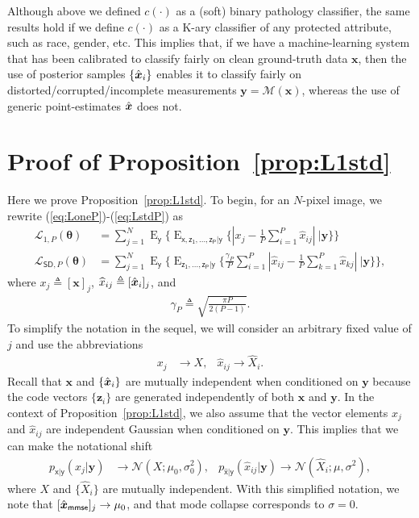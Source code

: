 \documentclass{article}
\theoremstyle{plain}
\theoremstyle{definition}
\theoremstyle{remark}
\renewcommand{\hat}{\widehat}
\newcommand{\defn}{\triangleq}
\newcommand{\hvec}[1]{\ensuremath{\Hat{\boldsymbol{#1}}}}
\renewcommand{\vec}[1]{\ensuremath{\boldsymbol{#1}}}
\newcommand{\mc}[1]{\ensuremath{\mathcal{#1}}}
\DeclareMathOperator{\E}{E}
\renewcommand{\eqref}[1]{(\ref{eq:#1})}
\newcommand{\propref}[1]{Proposition~\ref{prop:#1}}
\newcommand{\mmse}{_{\mathsf{mmse}}}
\newcommand{\pxgy}{p_{\mathsf{x}|\mathsf{y}}}
\newcommand{\pxhgy}{p_{\hat{\mathsf{x}}|\mathsf{y}}}
\newcommand{\Ey}{\E_{\mathsf{y}}}
\newcommand{\EzPgy}{\E_{\mathsf{z_1,...,z_P}|\mathsf{y}}}
\newcommand{\ExzPgy}{\E_{\mathsf{x,z_1,...,z_P}|\mathsf{y}}}
\newcommand{\LoneP}{\mc{L}_{1,P}}
\newcommand{\LstdP}{\mc{L}_{\mathsf{SD},P}}
\begin{document}
Although above we defined $c(\cdot)$ as a (soft) binary pathology classifier, the same results hold if we define $c(\cdot)$ as a K-ary classifier of any protected attribute, such as race, gender, etc.
This implies that, if we have a machine-learning system that has been calibrated to classify fairly on clean ground-truth data $\vec{x}$, then the use of posterior samples $\{\hvec{x}_i\}$ enables it to classify fairly on distorted/corrupted/incomplete measurements $\vec{y}=\mc{M}(\vec{x})$, whereas the use of generic point-estimates $\hvec{x}$ does not.

\section{Proof of \propref{L1std}} \label{app:L1std}

Here we prove \propref{L1std}.
To begin, for an $N$-pixel image, we rewrite \eqref{LoneP}-\eqref{LstdP} as
\begin{align}
\LoneP(\vec{\theta})
&= \textstyle \sum_{j=1}^N \Ey\big\{ 
\ExzPgy\big\{ |x_j-\frac{1}{P}\sum_{i=1}^P \hat{x}_{ij}|~\big|\vec{y}\big\} 
\big\} 
\label{eq:LonePB}\\
\LstdP(\vec{\theta})
&= \textstyle \sum_{j=1}^N \Ey\big\{ 
\EzPgy\big\{ \frac{\gamma_P}{P}\sum_{i=1}^P |\hat{x}_{ij}-\frac{1}{P}\sum_{k=1}^P \hat{x}_{kj}| ~\big|\vec{y}\big\} 
\big\}
\label{eq:LstdPB} ,
\end{align}
where $x_j\defn[\vec{x}]_j$, $\hat{x}_{ij}\defn[\hvec{x}_i]_j$, and
\begin{align}\textstyle
\gamma_P \defn \sqrt{\frac{\pi P}{2(P-1)}}
\label{eq:gammaP} .
\end{align}
To simplify the notation in the sequel, we will consider an arbitrary fixed value of $j$ and use the abbreviations 
\begin{align}
x_j &\rightarrow X,
&\hat{x}_{ij} \rightarrow \hat{X}_i
\label{eq:abbrev} .
\end{align}
Recall that $\vec{x}$ and $\{\hvec{x}_i\}$ are mutually independent when conditioned on $\vec{y}$ because the code vectors $\{\vec{z}_i\}$ are generated independently of both $\vec{x}$ and $\vec{y}$.
In the context of \propref{L1std}, we also assume that the vector elements $x_j$ and $\hat{x}_{ij}$ are independent Gaussian when conditioned on $\vec{y}$.
This implies that we can make the notational shift
\begin{align}
\pxgy(x_j|\vec{y}) &\rightarrow \mc{N}(X;\mu_0,\sigma_0^2) ,
&\pxhgy(\hat{x}_{ij}|\vec{y}) \rightarrow \mc{N}(\hat{X}_i;\mu,\sigma^2)
\label{eq:gauss} ,
\end{align}
where $X$ and $\{\hat{X}_i\}$ are mutually independent.
With this simplified notation, we note that $[\hvec{x}\mmse]_j\rightarrow \mu_0$, and that mode collapse corresponds to $\sigma=0$.
\end{document}
